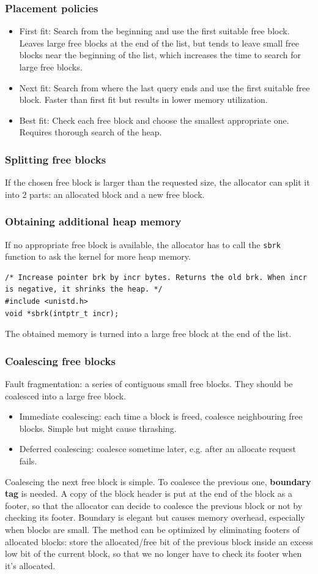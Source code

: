 \subsubsection{Placement policies}
\begin{itemize}
	\item First fit: Search from the beginning and use the first suitable free block. Leaves large free blocks at the end of the list, but tends to leave small free blocks near the beginning of the list, which increases the time to search for large free blocks. 
	\item Next fit: Search from where the last query ends and use the first suitable free block. Faster than first fit but results in lower memory utilization.
	\item Best fit: Check each free block and choose the smallest appropriate one. Requires thorough search of the heap.
\end{itemize}
\subsubsection{Splitting free blocks}
If the chosen free block is larger than the requested size, the allocator can split it into 2 parts: an allocated block and a new free block.
\subsubsection{Obtaining additional heap memory}
If no appropriate free block is available, the allocator has to call the \texttt{sbrk} function to ask the kernel for more heap memory. 
\begin{lstlisting}[frame=single]
/* Increase pointer brk by incr bytes. Returns the old brk. When incr is negative, it shrinks the heap. */
#include <unistd.h>
void *sbrk(intptr_t incr);
\end{lstlisting}
The obtained memory is turned into a large free block at the end of the list.
\subsubsection{Coalescing free blocks}
Fault fragmentation: a series of contiguous small free blocks. They should be coalesced into a large free block. 
\begin{itemize}
\item Immediate coalescing: each time a block is freed, coalesce neighbouring free blocks. Simple but might cause thrashing.
\item Deferred coalescing: coalesce sometime later, e.g. after an allocate request fails.
\end{itemize}
Coalescing the next free block is simple. To coalesce the previous one, \textbf{boundary tag} is needed. A copy of the block header is put at the end of the block as a footer, so that the allocator can decide to coalesce the previous block or not by checking its footer. Boundary is elegant but causes memory overhead, especially when blocks are small. The method can be optimized by eliminating footers of allocated blocks: store the allocated/free bit of the previous block inside an excess low bit of the current block, so that we no longer have to check its footer when it's allocated.
